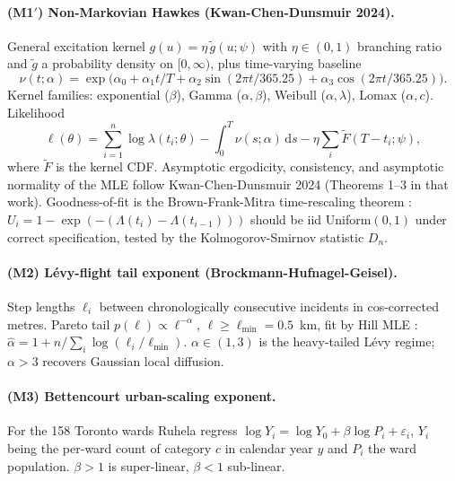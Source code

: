 \documentclass[11pt,a4paper]{article}
\newcommand{\rmd}{\,\mathrm{d}}
\newcommand{\1}{\mathbf{1}}
\theoremstyle{plain}
\theoremstyle{definition}
\begin{document}
\paragraph{(M1$'$) Non-Markovian Hawkes (Kwan-Chen-Dunsmuir 2024).}
General excitation kernel $g(u) = \eta\,\tilde g(u;\psi)$ with
$\eta\in(0,1)$ branching ratio and $\tilde g$ a probability density
on $[0,\infty)$, plus time-varying baseline
\begin{equation}\label{eq:baseline}
  \nu(t;\alpha) = \exp\!\bigl(\alpha_0
    + \alpha_1 t/T
    + \alpha_2 \sin(2\pi t/365.25)
    + \alpha_3 \cos(2\pi t/365.25)\bigr).
\end{equation}
Kernel families: exponential ($\beta$), Gamma ($\alpha,\beta$),
Weibull ($\alpha,\lambda$), Lomax ($\alpha,c$).  Likelihood
\begin{equation}\label{eq:loglik}
  \ell(\theta) = \sum_{i=1}^n \log\lambda(t_i;\theta)
  - \int_0^T \nu(s;\alpha)\rmd s
  - \eta \sum_i \tilde F(T-t_i;\psi),
\end{equation}
where $\tilde F$ is the kernel CDF.  Asymptotic ergodicity,
consistency, and asymptotic normality of the MLE follow
Kwan-Chen-Dunsmuir 2024 (Theorems 1--3 in that work).
Goodness-of-fit is the Brown-Frank-Mitra time-rescaling theorem
\cite{brown2002time}: $U_i = 1 - \exp(-(\Lambda(t_i)-\Lambda(t_{i-1})))$
should be iid Uniform$(0,1)$ under correct specification, tested
by the Kolmogorov-Smirnov statistic $D_n$.

\paragraph{(M2) Lévy-flight tail exponent (Brockmann-Hufnagel-Geisel).}
Step lengths $\ell_i$ between chronologically consecutive incidents
in cos-corrected metres.  Pareto tail
$p(\ell) \propto \ell^{-\alpha}$, $\ell \ge \ell_{\min} = 0.5$~km,
fit by Hill MLE \cite{hill1975simple}:
$\hat\alpha = 1 + n / \sum_i \log(\ell_i/\ell_{\min})$.
$\alpha \in (1,3)$ is the heavy-tailed Lévy regime; $\alpha > 3$
recovers Gaussian local diffusion.

\paragraph{(M3) Bettencourt urban-scaling exponent.}
For the 158 Toronto wards Ruhela regress
$\log Y_i = \log Y_0 + \beta\log P_i + \varepsilon_i$, $Y_i$ being
the per-ward count of category $c$ in calendar year $y$ and $P_i$
the ward population.  $\beta>1$ is super-linear, $\beta<1$ sub-linear.
\end{document}
